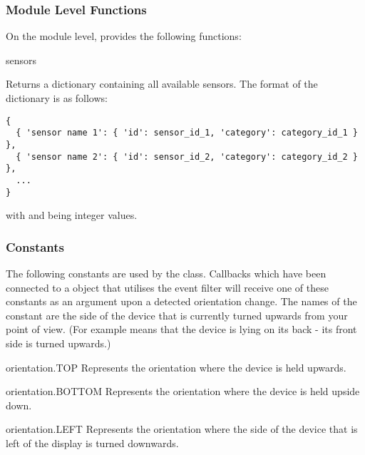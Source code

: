 \subsubsection{Module Level Functions}

On the module level,  provides the following functions:

\begin{funcdesc}{sensors}{}

Returns a dictionary containing all available sensors. The format of the dictionary is as follows:

\begin{verbatim}
{
  { 'sensor name 1': { 'id': sensor_id_1, 'category': category_id_1 } },
  { 'sensor name 2': { 'id': sensor_id_2, 'category': category_id_2 } },
  ...
}
\end{verbatim}

with  and  being integer values.

\end{funcdesc}

\subsubsection{Constants}

The following  constants are used by the  class.
Callbacks which have been connected to a  object that utilises the
 event filter will receive one of these constants as an argument
upon a detected orientation change. The names of the constant are the side of the device that
is currently turned upwards from your point of view. (For example  means that
the device is lying on its back - its front side is turned upwards.)

\begin{memberdesc}{orientation.TOP}
Represents the orientation where the device is held upwards.
\end{memberdesc}

\begin{memberdesc}{orientation.BOTTOM}
Represents the orientation where the device is held upside down.
\end{memberdesc}

\begin{memberdesc}{orientation.LEFT}
Represents the orientation where the side of the device that is left of the display is turned downwards.
\end{memberdesc}

